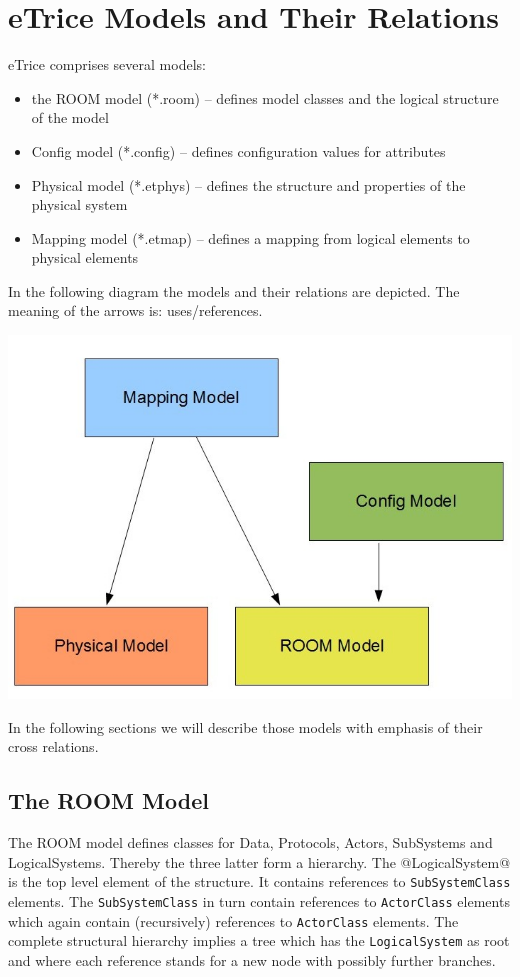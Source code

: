 \chapter{eTrice Models and Their Relations}

eTrice comprises several models:

\begin{itemize}
\item the ROOM model (*.room) -- defines model classes and the logical structure of the model
\item Config model (*.config) -- defines configuration values for attributes
\item Physical model (*.etphys) -- defines the structure and properties of the physical system
\item Mapping model (*.etmap) -- defines a mapping from logical elements to physical elements
\end{itemize}

In the following diagram the models and their relations are depicted. The meaning of the arrows is: 
uses/references.

\includegraphics[scale=0.4]{images/080-models.jpg}

In the following sections we will describe those models with emphasis of their cross relations.

\section{The ROOM Model}

The ROOM model defines classes for Data, Protocols, Actors, SubSystems and LogicalSystems.
Thereby the three latter form a hierarchy. The @LogicalSystem@ is the top level element of the structure. 
It contains references to \texttt{SubSystemClass} elements. The \texttt{SubSystemClass} in turn contain 
references to \texttt{ActorClass} elements which again contain (recursively) references to 
\texttt{ActorClass} elements. The complete structural hierarchy implies a tree which has the 
\texttt{LogicalSystem} as root and where each reference stands for a new node with possibly further 
branches.

